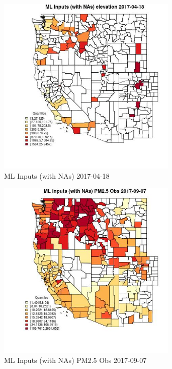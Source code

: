 \begin{figure} 
\centering  
\includegraphics[width=0.77\textwidth]{Code_Outputs/Report_ML_input_PM25_Step4_part_e_de_duplicated_aveswNAs_CountyelevationMean2017-04-18_2017-04-18.jpg} 
\caption{\label{fig:Report_ML_input_PM25_Step4_part_e_de_duplicated_aveswNAsCountyelevationMean2017-04-18_2017-04-18}ML Inputs (with NAs) 2017-04-18} 
\end{figure} 
 

\begin{figure} 
\centering  
\includegraphics[width=0.77\textwidth]{Code_Outputs/Report_ML_input_PM25_Step4_part_e_de_duplicated_aveswNAs_CountyPM25_ObsMean2017-09-07_2017-09-07.jpg} 
\caption{\label{fig:Report_ML_input_PM25_Step4_part_e_de_duplicated_aveswNAsCountyPM25_ObsMean2017-09-07_2017-09-07}ML Inputs (with NAs) PM2.5 Obs 2017-09-07} 
\end{figure} 
 

